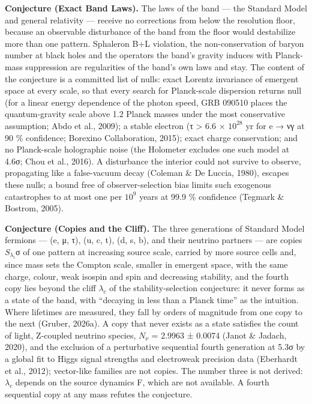 \documentclass[
]{article}
\begin{document}
\textbf{Conjecture (Exact Band Laws).} The laws of the band --- the
Standard Model and general relativity --- receive no corrections from
below the resolution floor, because an observable disturbance of the
band from the floor would destabilize more than one pattern. Sphaleron
B+L violation, the non-conservation of baryon number at black holes and
the operators the band's gravity induces with Planck-mass suppression
are regularities of the band's own laws and stay. The content of the
conjecture is a committed list of nulls: exact Lorentz invariance of
emergent space at every scale, so that every search for Planck-scale
dispersion returns null (for a linear energy dependence of the photon
speed, GRB 090510 places the quantum-gravity scale above 1.2 Planck
masses under the most conservative assumption; Abdo et al., 2009); a
stable electron (τ \textgreater{} 6.6 × \(10^{28}\) yr for e → νγ at 90
\% confidence; Borexino Collaboration, 2015); exact charge conservation;
and no Planck-scale holographic noise (the Holometer excludes one such
model at 4.6σ; Chou et al., 2016). A disturbance the interior could not
survive to observe, propagating like a false-vacuum decay (Coleman \& De
Luccia, 1980), escapes these nulls; a bound free of observer-selection
bias limits such exogenous catastrophes to at most one per \(10^9\)
years at 99.9 \% confidence (Tegmark \& Bostrom, 2005).

\textbf{Conjecture (Copies and the Cliff).} The three generations of
Standard Model fermions --- (e, μ, τ), (u, c, t), (d, s, b), and their
neutrino partners --- are copies \(S_{\lambda_i}\)σ of one pattern at
increasing source scale, carried by more source cells and, since mass
sets the Compton scale, smaller in emergent space, with the same charge,
colour, weak isospin and spin and decreasing stability, and the fourth
copy lies beyond the cliff \(\lambda_c\) of the stability-selection
conjecture: it never forms as a state of the band, with ``decaying in
less than a Planck time'' as the intuition. Where lifetimes are
measured, they fall by orders of magnitude from one copy to the next
(Gruber, 2026a). A copy that never exists as a state satisfies the count
of light, Z-coupled neutrino species, \(N_\nu\) = 2.9963 ± 0.0074 (Janot
\& Jadach, 2020), and the exclusion of a perturbative sequential fourth
generation at 5.3σ by a global fit to Higgs signal strengths and
electroweak precision data (Eberhardt et al., 2012); vector-like
families are not copies. The number three is not derived: \(\lambda_c\)
depends on the source dynamics F, which are not available. A fourth
sequential copy at any mass refutes the conjecture.
\end{document}
